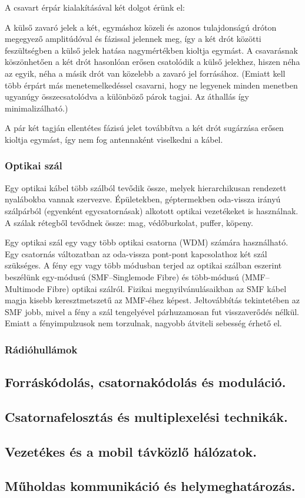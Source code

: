 A csavart érpár kialakításával két dolgot érünk el:
\begin{description}[nosep]
	\item[Zajcsökkentés] A külső zavaró jelek a két, egymáshoz közeli és azonos tulajdonságú dróton megegyező amplitúdóval és fázissal jelennek meg, így a két drót közötti feszültségben a külső jelek hatása nagymértékben kioltja egymást. A csavarásnak köszönhetően a két drót hasonlóan erősen csatolódik a külső jelekhez, hiszen néha az egyik, néha a másik drót van közelebb a zavaró jel forrásához. (Emiatt kell több érpárt más menetemelkedéssel csavarni, hogy ne legyenek minden menetben ugyanúgy összecsatolódva a különböző párok tagjai. Az áthallás így minimalizálható.)
	\item[Vezeték sugárzásának csökkentése] A pár két tagján ellentétes fázisú jelet továbbítva a két drót sugárzása erősen kioltja egymást, így nem fog antennaként viselkedni a kábel.
\end{description}
\subsubsection{Optikai szál}
Egy optikai kábel több szálból tevődik össze, melyek hierarchikusan rendezett nyalábokba vannak szervezve. Épületekben, géptermekben oda-vissza irányú szálpárból (egyenként egycsatornásak) alkotott optikai vezetékeket is használnak. A szálak rétegből tevődnek össze: mag, védőburkolat, puffer, köpeny. 

Egy optikai szál egy vagy több optikai csatorna (WDM) számára használható. Egy csatornás változatban az oda-vissza pont-pont kapcsolathoz két szál szükséges. A fény egy vagy több módusban terjed az optikai szálban eszerint beszélünk egy-módusú (SMF--Singlemode Fibre) és több-módusú (MMF--Multimode Fibre) optikai szálról. Fizikai megnyilvánulásaikban az SMF kábel magja kisebb keresztmetszetű az MMF-éhez képest. Jeltovábbítás tekintetében az SMF jobb, mivel a fény a szál tengelyével párhuzamosan fut visszaverődés nélkül. Emiatt a fényimpulzusok nem torzulnak, nagyobb átviteli sebesség érhető el.

\subsubsection{Rádióhullámok}


\subsection{Forráskódolás, csatornakódolás és moduláció.}


\subsection{Csatornafelosztás és multiplexelési technikák.}


\subsection{Vezetékes és a mobil távközlő hálózatok.}


\subsection{Műholdas kommunikáció és helymeghatározás.}


